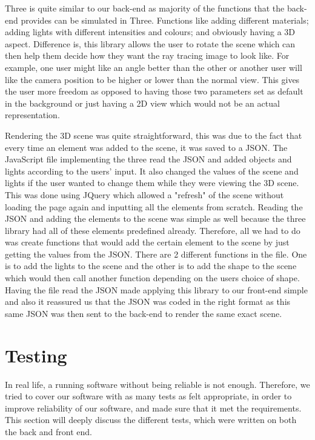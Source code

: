 \documentclass[a4paper]{report}
\begin{document}
	\par Three is quite similar to our back-end as majority of the functions that the back-end provides can be simulated in Three. Functions like adding different materials; adding lights with different intensities and colours; and obviously having a 3D aspect. Difference is, this library allows the user to rotate the scene which can then help them decide how they want the ray tracing image to look like. For example, one user might like an angle better than the other or another user will like the camera position to be higher or lower than the normal view. This gives the user more freedom as opposed to having those two parameters set as default in the background or just having a 2D view which would not be an actual representation.\newline 
	
	\par Rendering the 3D scene was quite straightforward, this was due to the fact that every time an element was added to the scene, it was saved to a JSON. The JavaScript file implementing the three read the JSON and added objects and lights according to the users' input. It also changed the values of the scene and lights if the user wanted to change them while they were viewing the 3D scene. This was done using JQuery which allowed a "refresh" of the scene without loading the page again and inputting all the elements from scratch. Reading the JSON and adding the elements to the scene was simple as well because the three library had all of these elements predefined already. Therefore, all we had to do was create functions that would add the certain element to the scene by just getting the values from the JSON. There are 2 different functions in the file. One is to add the lights to the scene and the other is to add the shape to the scene which would then call another function depending on the users choice of shape. Having the file read the JSON made applying this library to our front-end simple and also it reassured us that the JSON was coded in the right format as this same JSON was then sent to the back-end to render the same exact scene.
	
	
	\section{Testing}
	In real life, a running software without being reliable is not enough. Therefore, we tried to cover our software with as many tests as felt appropriate, in order to improve reliability of our software, and made sure that it met the requirements. This section will deeply discuss the different tests, which were written on both the back and front end.
\end{document}
